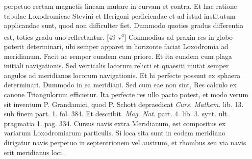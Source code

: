 perpetuo rectam magnetis\protect{} lineam mutare in curvam et contra. Et hac ratione tabulae Loxodromicae\protect{} Stevini\protect{} et Herigoni\protect{} perficiendae et ad istud institutum applicandae sunt, quod non difficulter fiet. Dummodo quoties gradus differentia est, toties gradu uno reflectantur. 
      [49 v\textsuperscript{o}] Commodius ad praxin res in globo poterit determinari, ubi semper apparet in horizonte  faciat Loxodromia\protect{} ad meridianum\protect{}. Facit ac semper eundem cum priore. Et ita eundem cum plaga initiali navigationis. Sed verticalis locorum relicti et quaesiti mutat semper angulos ad meridianos\protect{} locorum navigationis. Et hi perfecte possunt ex sphaera determinari. Dummodo in ea  meridiani\protect{}. Sed cum eae non sint, Res calculo ex canone Triangulorum efficietur. Ita perfecte res  ullo pacto potest, et modo verum sit inventum P. Grandamici\protect{}, quod P. Schott\protect{} depraedicat \cite{00093}\textit{Curs. Mathem.} lib. 13. sub finem part. 1. fol. 384. Et describit. \cite{00094}\textit{Mag. Nat.} part. 4. lib. 3. synt. ult. pragmatia 1. pag. 334. Cursus navis\protect{} extra Meridianum\protect{},  est compositus ex variarum Loxodromiarum\protect{} particulis. Si loca sita sunt in eodem meridiano\protect{} dirigatur navis\protect{} perpetuo in septentrionem vel austrum, et rhombus seu via navis\protect{} erit meridianus\protect{} loci. 
\pend 